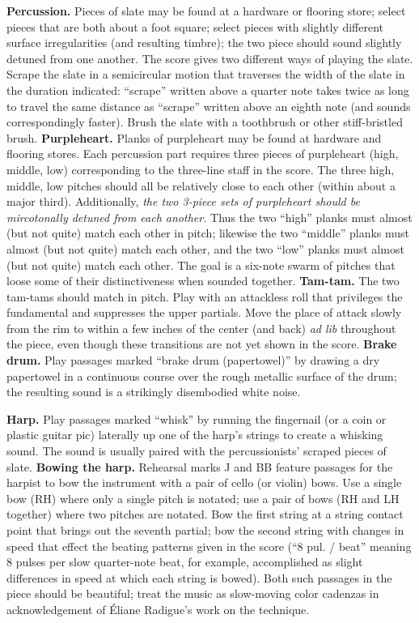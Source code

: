 \textbf{Percussion.} Pieces of slate may be found at a hardware or flooring
store; select pieces that are both about a foot square; select pieces with
slightly different surface irregularities (and resulting timbre); the two piece
should sound slightly detuned from one another. The score gives two different
ways of playing the slate. Scrape the slate in a semicircular motion that
traverses the width of the slate in the duration indicated: ``scrape'' written
above a quarter note takes twice as long to travel the same distance as
``scrape'' written above an eighth note (and sounds correspondingly faster).
Brush the slate with a toothbrush or other stiff-bristled brush.
\textbf{Purpleheart.} Planks of purpleheart may be found at hardware and
flooring stores. Each percussion part requires three pieces of purpleheart
(high, middle, low) corresponding to the three-line staff in the score. The
three high, middle, low pitches should all be relatively close to each other
(within about a major third). Additionally, \textit{the two 3-piece sets of
purpleheart should be mircotonally detuned from each another.} Thus the two
``high'' planks must almost (but not quite) match each other in pitch; likewise
the two ``middle'' planks must almost (but not quite) match each other, and the
two ``low'' planks must almost (but not quite) match each other. The goal is a
six-note swarm of pitches that loose some of their distinctiveness when sounded
together. \textbf{Tam-tam.} The two tam-tams should match in pitch. Play with
an attackless roll that privileges the fundamental and suppresses the upper
partials. Move the place of attack slowly from the rim to within a few inches
of the center (and back) \textit{ad lib} throughout the piece, even though
these transitions are not yet shown in the score. \textbf{Brake drum.} Play
passages marked ``brake drum (papertowel)'' by drawing a dry papertowel in a
continuous course over the rough metallic surface of the drum; the resulting
sound is a strikingly disembodied white noise.

\textbf{Harp.} Play passages marked ``whisk'' by running the fingernail (or a
coin or plastic guitar pic) laterally up one of the harp's strings to create a
whisking sound. The sound is usually paired with the percussionists' scraped
pieces of slate. \textbf{Bowing the harp.} Rehearsal marks J and BB feature
passages for the harpist to bow the instrument with a pair of cello (or violin)
bows. Use a single bow (RH) where only a single pitch is notated; use a pair of
bows (RH and LH together) where two pitches are notated. Bow the first string
at a string contact point that brings out the seventh partial; bow the second
string with changes in speed that effect the beating patterns given in the
score (``8 pul. / beat'' meaning 8 pulses per slow quarter-note beat, for
example, accomplished as slight differences in speed at which each string is
bowed). Both such passages in the piece should be beautiful; treat the music as
slow-moving color cadenzas in acknowledgement of \'{E}liane Radigue's work on
the technique.

